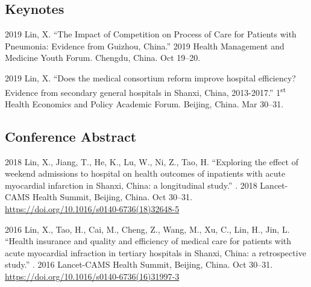 \documentclass[12pt,letterpaper]{report}
\begin{document}
    \subsection*{Keynotes}

    \begin{tablist}
    
    	 \item[2019] \tab Lin, X. \enquote{The Impact of Competition on Process of Care for Patients with Pneumonia: Evidence from Guizhou, China.}  2019 Health Management and Medicine Youth Forum. Chengdu, China. Oct 19--20.
		        
        \item[2019] \tab Lin, X. \enquote{Does the medical consortium reform improve hospital efficiency? Evidence from secondary general hospitals in Shanxi, China, 2013-2017.}  1\textsuperscript{st} Health Economics and Policy Academic Forum. Beijing, China. Mar 30--31.
		
    \end{tablist}
    

    \subsection*{Conference Abstract}

    \begin{tablist}
        
        \item[2018] \tab Lin, X., Jiang, T., He, K., Lu, W., Ni, Z., Tao, H. \enquote{Exploring the effect of weekend admissions to hospital on health outcomes of inpatients with acute myocardial infarction in Shanxi, China: a longitudinal study.} . 2018 Lancet-CAMS Health Summit, Beijing, China. Oct 30--31. \href{https://doi.org/10.1016/s0140-6736(18)32648-5}{https://doi.org/10.1016/s0140-6736(18)32648-5}

        
		\item[2016] \tab Lin, X., Tao, H., Cai, M., Cheng, Z., Wang, M., Xu, C., Lin, H., Jin, L. \enquote{Health insurance and quality and efficiency of medical care for patients with acute myocardial infraction in tertiary hospitals in Shanxi, China: a retrospective study.} . 2016 Lancet-CAMS Health Summit, Beijing, China. Oct 30--31.  \href{https://doi.org/10.1016/s0140-6736(16)31997-3}{https://doi.org/10.1016/s0140-6736(16)31997-3 }            
  
    \end{tablist}
    
    
    
\end{document}
